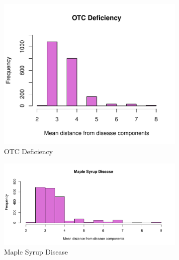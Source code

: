 \begin{figure}[h!]
     \hfill
     \begin{subfigure}[b]{0.3\textwidth}
         \centering
         \includegraphics[scale=0.25]{Images/OTC Deficiency.pdf}
         \caption{OTC Deficiency}
         \label{fig:OTC}
     \end{subfigure}
     \hfill
      \begin{subfigure}[b]{0.3\textwidth}
         \centering
         \includegraphics[scale=0.25]{Images/Maple Syrup Disease.pdf}
         \caption{Maple Syrup Disease}
         \label{fig:Maple Syrup}
     \end{subfigure}
     \hfill
     \begin{subfigure}[b]{0.3\textwidth}
         \centering

\end{subfigure}
\end{figure}

